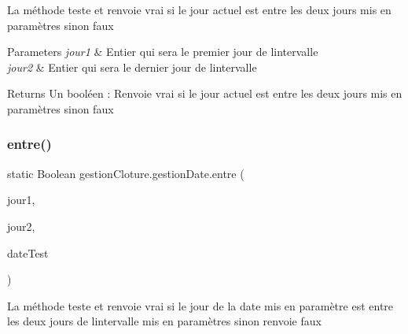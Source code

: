 La méthode teste et renvoie vrai si le jour actuel est entre les deux jours mis en paramètres sinon faux ~\newline



\begin{DoxyParams}{Parameters}
{\em jour1} & Entier qui sera le premier jour de l\textquotesingle{}intervalle\\
\hline
{\em jour2} & Entier qui sera le dernier jour de l\textquotesingle{}intervalle\\
\hline
\end{DoxyParams}
\begin{DoxyReturn}{Returns}
Un booléen \+: Renvoie vrai si le jour actuel est entre les deux jours mis en paramètres sinon faux
\end{DoxyReturn}
\mbox{\label{classgestion_cloture_1_1gestion_date_a8c1ca7bb5e1827fd1a120d6933f83d49}} 
\subsubsection{\texorpdfstring{entre()}{entre()}\hspace{0.1cm}{\footnotesize\ttfamily [2/2]}}
{\footnotesize\ttfamily static Boolean gestion\+Cloture.\+gestion\+Date.\+entre (\begin{DoxyParamCaption}\item[{int}]{jour1,  }\item[{int}]{jour2,  }\item[{Date\+Time}]{date\+Test }\end{DoxyParamCaption})\hspace{0.3cm}{\ttfamily [static]}}



La méthode teste et renvoie vrai si le jour de la date mis en paramètre est entre les deux jours de l\textquotesingle{}intervalle mis en paramètres sinon renvoie faux ~\newline



